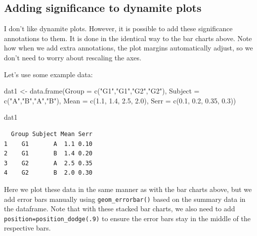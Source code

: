 \documentclass[
  letterpaper,
  DIV=11,
  numbers=noendperiod]{scrreprt}
\newenvironment{Shaded}{\begin{snugshade}}{\end{snugshade}}
\newcommand{\AttributeTok}[1]{\textcolor[rgb]{0.40,0.45,0.13}{#1}}
\newcommand{\FloatTok}[1]{\textcolor[rgb]{0.68,0.00,0.00}{#1}}
\newcommand{\FunctionTok}[1]{\textcolor[rgb]{0.28,0.35,0.67}{#1}}
\newcommand{\NormalTok}[1]{\textcolor[rgb]{0.00,0.23,0.31}{#1}}
\newcommand{\OtherTok}[1]{\textcolor[rgb]{0.00,0.23,0.31}{#1}}
\newcommand{\StringTok}[1]{\textcolor[rgb]{0.13,0.47,0.30}{#1}}
\begin{document}
\hypertarget{adding-significance-to-dynamite-plots}{%
\subsection{Adding significance to dynamite
plots}\label{adding-significance-to-dynamite-plots}}

I don't like dynamite plots. However, it is possible to add these
significance annotations to them. It is done in the identical way to the
bar charts above. Note how when we add extra annotations, the plot
margins automatically adjust, so we don't need to worry about rescaling
the axes.

Let's use some example data:

\begin{Shaded}
\begin{Highlighting}[]
\NormalTok{dat1 }\OtherTok{\textless{}{-}} \FunctionTok{data.frame}\NormalTok{(}\AttributeTok{Group =} \FunctionTok{c}\NormalTok{(}\StringTok{"G1"}\NormalTok{,}\StringTok{"G1"}\NormalTok{,}\StringTok{"G2"}\NormalTok{,}\StringTok{"G2"}\NormalTok{),}
                   \AttributeTok{Subject =} \FunctionTok{c}\NormalTok{(}\StringTok{"A"}\NormalTok{,}\StringTok{"B"}\NormalTok{,}\StringTok{"A"}\NormalTok{,}\StringTok{"B"}\NormalTok{),}
                   \AttributeTok{Mean =} \FunctionTok{c}\NormalTok{(}\FloatTok{1.1}\NormalTok{, }\FloatTok{1.4}\NormalTok{, }\FloatTok{2.5}\NormalTok{, }\FloatTok{2.0}\NormalTok{),}
                   \AttributeTok{Serr =} \FunctionTok{c}\NormalTok{(}\FloatTok{0.1}\NormalTok{, }\FloatTok{0.2}\NormalTok{, }\FloatTok{0.35}\NormalTok{, }\FloatTok{0.3}\NormalTok{))}

\NormalTok{dat1}
\end{Highlighting}
\end{Shaded}

\begin{verbatim}
  Group Subject Mean Serr
1    G1       A  1.1 0.10
2    G1       B  1.4 0.20
3    G2       A  2.5 0.35
4    G2       B  2.0 0.30
\end{verbatim}

Here we plot these data in the same manner as with the bar charts above,
but we add error bars manually using \texttt{geom\_errorbar()} based on
the summary data in the dataframe. Note that with these stacked bar
charts, we also need to add \texttt{position=position\_dodge(.9)} to
ensure the error bars stay in the middle of the respective bars.
\end{document}
